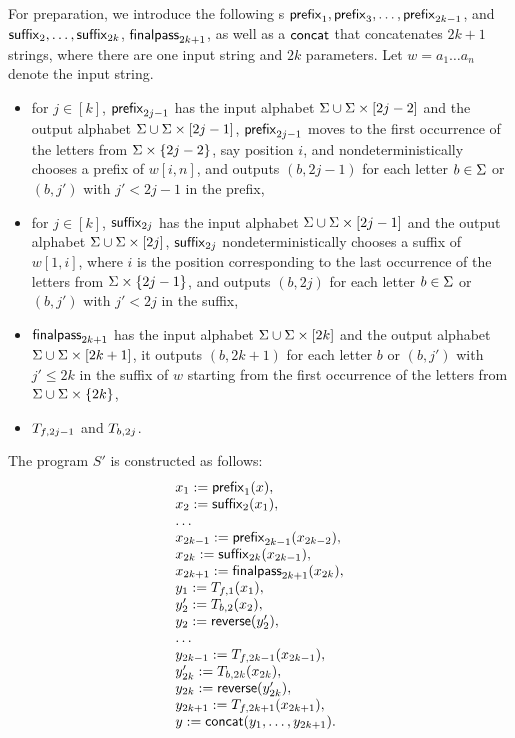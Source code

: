 For preparation, we introduce the following \FT{}s $\mathsf{prefix}_1, \mathsf{prefix}_3, \ldots, \mathsf{prefix}_{2k-1}$, and $\mathsf{suffix}_2, \ldots, \mathsf{suffix}_{2k}$, $\mathsf{finalpass}_{2k+1}$, as well as a \PT{}  $\mathsf{concat}$ that concatenates $2k+1$ strings, where there are one input string and $2k$ parameters. Let $w = a_1 \ldots a_n$ denote the input string.
\begin{itemize}
\item for $j \in [k]$, $\mathsf{prefix}_{2j-1}$  has the input alphabet $\Sigma \cup \Sigma \times [2j-2]$ and the output alphabet $\Sigma \cup \Sigma \times [2j-1]$, $\mathsf{prefix}_{2j-1}$ moves to the first occurrence of the letters from $\Sigma \times \{2j-2\}$, say position $i$, and nondeterministically chooses a prefix of $w[i, n]$, and outputs $(b, 2j-1)$ for each letter $b \in \Sigma$ or $(b, j')$ with $j' < 2j-1$ in the prefix,
%
\item for $j \in [k]$, $\mathsf{suffix}_{2j}$ has the input alphabet $\Sigma \cup \Sigma \times [2j-1]$ and the output alphabet $\Sigma \cup \Sigma \times [2j]$, $\mathsf{suffix}_{2j}$ nondeterministically chooses  a suffix of $w[1, i]$, where $i$ is the position corresponding to the last occurrence of the letters from $\Sigma \times \{2j-1\}$, and outputs $(b, 2j)$ for each letter $b \in \Sigma$ or $(b, j')$ with $j' < 2j$ in the suffix,
%
\item $\mathsf{finalpass}_{2k+1}$ has the input alphabet $\Sigma \cup \Sigma \times [2k]$ and the output alphabet $\Sigma \cup \Sigma \times [2k+1]$, it outputs $(b, 2k+1)$ for each letter $b$ or $(b, j')$ with $j' \le 2k$ in the suffix of $w$ starting from the first occurrence of the letters from $\Sigma \cup \Sigma \times \{2k\}$,
%
\item $T_{f, 2j-1}$ and $T_{b, 2j}$.
\end{itemize}

%
The program $S'$ is constructed as follows: 
\[
\begin{array}{l}
x_1 := \prefix_1(x), \\
%
x_2 := \suffix_{2} (x_1), \\
%
\ldots \\
%
x_{2k-1} := \prefix_{2k-1}(x_{2k-2}), \\
%
x_{2k} := \suffix_{2k} (x_{2k-1}), \\
% 
x_{2k+1} := \finalpass_{2k+1}(x_{2k}),\\
%
y_1 := \Transducer_{f,1}(x_1),\\
%
y'_2 := \Transducer_{b,2}(x_2),\\
%
y_2 := \reverse(y'_2),\\
%
\ldots\\
%
y_{2k-1} := \Transducer_{f, 2k-1}(x_{2k-1}),\\
%
y'_{2k} := \Transducer_{b, 2k}(x_{2k}),\\
%
y_{2k} := \reverse(y'_{2k}),\\
%
y_{2k+1} :=\Transducer_{f, 2k+1}(x_{2k+1}),\\
%
y := \concatpt(y_1, \ldots, y_{2k+1}).
\end{array}
\]
